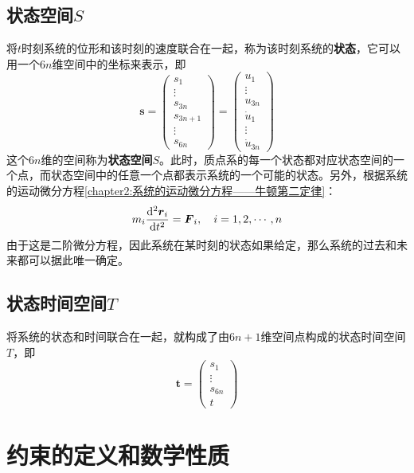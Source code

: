 \subsection{状态空间$S$}

将$t$时刻系统的位形和该时刻的速度联合在一起，称为该时刻系统的{\bf 状态}，它可以用一个$6n$维空间中的坐标来表示，即
\begin{equation}
    \boldsymbol{s} = \begin{pmatrix}
        s_1 \\ \vdots \\ s_{3n} \\ s_{3n+1} \\ \vdots \\ s_{6n}
    \end{pmatrix} = \begin{pmatrix}
        u_1 \\ \vdots \\ u_{3n} \\ \dot{u}_{1} \\ \vdots \\ \dot{u}_{3n}
    \end{pmatrix}
\end{equation}
这个$6n$维的空间称为{\bf 状态空间}$S$。此时，质点系的每一个状态都对应状态空间的一个点，而状态空间中的任意一个点都表示系统的一个可能的状态。另外，根据系统的运动微分方程\eqref{chapter2:系统的运动微分方程——牛顿第二定律}：
\begin{equation}
    m_i\frac{\mathrm{d}^2\boldsymbol{r}_i}{\mathrm{d} t^2} = \boldsymbol{F}_i, \quad i = 1,2,\cdots,n
\end{equation}
由于这是二阶微分方程，因此系统在某时刻的状态如果给定，那么系统的过去和未来都可以据此唯一确定。

\subsection{状态时间空间$T$}

将系统的状态和时间联合在一起，就构成了由$6n+1$维空间点构成的状态时间空间$T$，即
\begin{equation}
    \boldsymbol{t} = \begin{pmatrix}
        s_1 \\ \vdots \\ s_{6n} \\ t
    \end{pmatrix}
\end{equation}

\section{约束的定义和数学性质}

